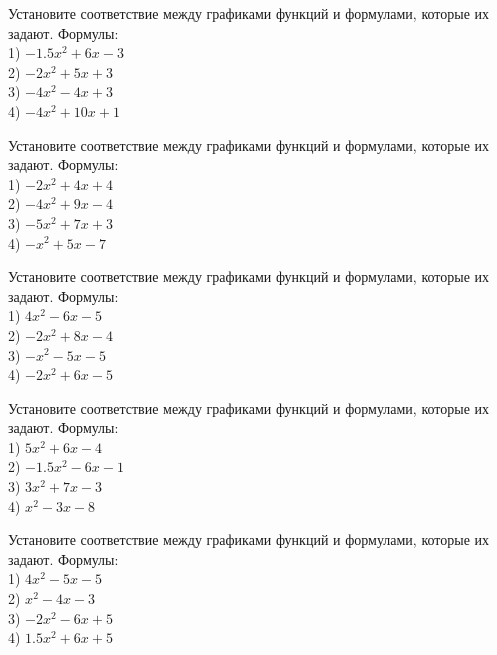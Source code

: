 \documentclass[4apaper]{article}
\begin{document}
\begin{taskBN}{73}
Установите соответствие между графиками функций и формулами, которые их задают. Формулы: \\1) $-1.5x^2+6x-3$\\2) $-2x^2+5x+3$\\3) $-4x^2-4x+3$\\4) $-4x^2+10x+1$
\end{taskBN}

\begin{taskBN}{74}
Установите соответствие между графиками функций и формулами, которые их задают. Формулы: \\1) $-2x^2+4x+4$\\2) $-4x^2+9x-4$\\3) $-5x^2+7x+3$\\4) $-x^2+5x-7$
\end{taskBN}

\begin{taskBN}{75}
Установите соответствие между графиками функций и формулами, которые их задают. Формулы: \\1) $4x^2-6x-5$\\2) $-2x^2+8x-4$\\3) $-x^2-5x-5$\\4) $-2x^2+6x-5$
\end{taskBN}

\begin{taskBN}{76}
Установите соответствие между графиками функций и формулами, которые их задают. Формулы: \\1) $5x^2+6x-4$\\2) $-1.5x^2-6x-1$\\3) $3x^2+7x-3$\\4) $x^2-3x-8$
\end{taskBN}

\begin{taskBN}{77}
Установите соответствие между графиками функций и формулами, которые их задают. Формулы: \\1) $4x^2-5x-5$\\2) $x^2-4x-3$\\3) $-2x^2-6x+5$\\4) $1.5x^2+6x+5$
\end{taskBN}
\end{document}

